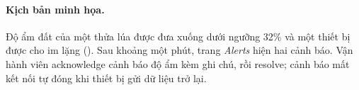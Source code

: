 \paragraph{Kịch bản minh họa.} Độ ẩm đất của một thửa lúa được đưa xuống dưới ngưỡng 32\% và một thiết bị được cho im lặng (). Sau khoảng một phút, trang \emph{Alerts} hiện hai cảnh báo. Vận hành viên acknowledge cảnh báo độ ẩm kèm ghi chú, rồi resolve; cảnh báo mất kết nối tự đóng khi thiết bị gửi dữ liệu trở lại. 
